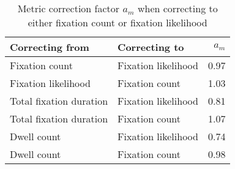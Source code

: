 \begin{table}[ht]
\centering
\caption{Metric correction factor $a_m$ when correcting to either fixation count or fixation likelihood} 
\label{tab:metric_correction}
\begin{tabular}{llr}
  \hline
Correcting from & Correcting to & $a_m$ \\ 
  \hline
Fixation count & Fixation likelihood & 0.97 \\ 
  Fixation likelihood & Fixation count & 1.03 \\ 
  Total fixation duration & Fixation likelihood & 0.81 \\ 
  Total fixation duration & Fixation count & 1.07 \\ 
  Dwell count & Fixation likelihood & 0.74 \\ 
  Dwell count & Fixation count & 0.98 \\ 
   \hline
\end{tabular}
\end{table}
